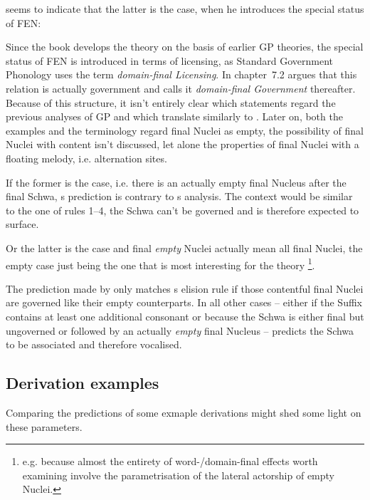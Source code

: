  seems to indicate that the latter
is the case, when he introduces the special status
of \gls{FEN}: 

Since the book develops the \CVCV theory on the basis
of earlier \gls{GP} theories, the special status of
\gls{FEN} is introduced in terms of licensing,
as Standard Government Phonology uses the term
\emph{domain-final Licensing}.
In chapter~7.2  argues
that this relation is actually government and calls
it \emph{domain-final Government} thereafter.
Because of this structure, it isn't entirely clear which
statements regard the previous analyses of \gls{GP} and
which translate similarly to \CVCV.
Later on, both the examples and the terminology regard
final Nuclei as empty, the possibility of final Nuclei
with content isn't discussed,
let alone the properties of final Nuclei with a floating
melody, i.e. alternation sites.

If the former is the case, i.e. there is an actually empty
final Nucleus after the final Schwa, \CVCV{}s prediction
is contrary to \citeauthor{issatschenko1974}s analysis.
The context would be similar to the one of rules 1--4,
the Schwa can't be governed and is therefore expected to
surface.

Or the latter is the case and final \emph{empty} Nuclei
actually mean all final Nuclei, the empty case just being
the one that is most interesting for the theory%
\footnote{e.g. because almost the entirety of
  word-/domain-final effects worth examining involve the
  parametrisation of the lateral actorship of empty Nuclei.}.

The prediction made by \CVCV only matches
s elision rule if those
contentful final Nuclei are governed like their
empty counterparts. In all other cases -- either if
the Suffix contains at least one additional consonant or
because the Schwa is either final but ungoverned or followed
by an actually \emph{empty} final Nucleus --
\CVCV{} predicts the Schwa to be associated and therefore
vocalised.


\subsection{Derivation examples}
Comparing the predictions of some exmaple derivations might shed
some light on these parameters.

